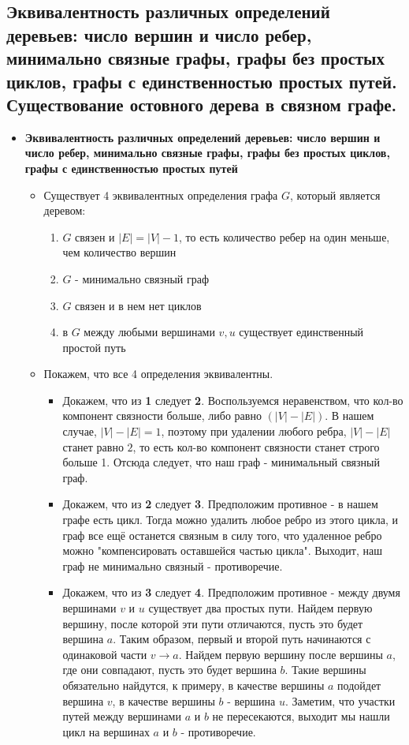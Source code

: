 \subsection{Эквивалентность различных определений деревьев: число вершин и число ребер, минимально связные графы, графы без простых циклов, графы с единственностью простых путей. Существование остовного дерева в связном графе.}
\begin{itemize}
	\item \textbf{Эквивалентность различных определений деревьев: число вершин и число ребер, минимально связные графы, графы без простых циклов, графы с единственностью простых путей}
		\begin{itemize}
		    \item
		    Существует 4 эквивалентных определения графа $G$, который является деревом:
		    \begin{enumerate}
		    \item $G$ связен и $|E| = |V| - 1$, то есть количество ребер на один меньше, чем количество вершин
		    \item $G$ - минимально связный граф
		    \item $G$ связен и в нем нет циклов
		    \item в $G$ между любыми вершинами $v, u$ существует единственный простой путь
		    \end{enumerate}
		
		    \item Покажем, что все 4 определения эквивалентны.
		    \begin{itemize}
		    \item
		    Докажем, что из \textbf{1} следует \textbf{2}. Воспользуемся неравенством, что кол-во компонент связности больше, либо равно $(|V| - |E|)$. В нашем случае, $|V| - |E| = 1$, поэтому при удалении любого ребра, $|V| - |E|$ станет равно $2$, то есть кол-во компонент связности станет строго больше 1. Отсюда следует, что наш граф - минимальный связный граф.
		
		    \item
		    Докажем, что из \textbf{2} следует \textbf{3}. Предположим противное - в нашем графе есть цикл. Тогда можно удалить любое ребро из этого цикла, и граф все ещё останется связным в силу того, что удаленное ребро можно "компенсировать оставшейся частью цикла". Выходит, наш граф не минимально связный - противоречие.
		
		    \item
		    Докажем, что из \textbf{3} следует \textbf{4}. Предположим противное - между двумя вершинами $v$ и $u$ существует два простых пути. Найдем первую вершину, после которой эти пути отличаются, пусть это будет вершина $a$. Таким образом, первый и второй путь начинаются с одинаковой части $v \to a$. Найдем первую вершину после вершины $a$, где они совпадают, пусть это будет вершина $b$. Такие вершины обязательно найдутся, к примеру, в качестве вершины $a$ подойдет вершина $v$, в качестве вершины $b$ - вершина $u$. Заметим, что участки путей между вершинами $a$ и $b$ не пересекаются, выходит мы нашли цикл на вершинах $a$ и $b$ - противоречие.
		

\end{itemize}
\end{itemize}
\end{itemize}
